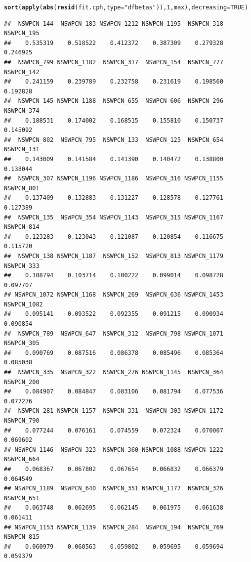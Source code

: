 \documentclass{article}\usepackage[]{graphicx}\usepackage[]{color}
\makeatletter
\newcommand{\hlnum}[1]{\textcolor[rgb]{0.686,0.059,0.569}{#1}}%
\newcommand{\hlstr}[1]{\textcolor[rgb]{0.192,0.494,0.8}{#1}}%
\newcommand{\hlstd}[1]{\textcolor[rgb]{0.345,0.345,0.345}{#1}}%
\newcommand{\hlkwc}[1]{\textcolor[rgb]{0.333,0.667,0.333}{#1}}%
\newcommand{\hlkwd}[1]{\textcolor[rgb]{0.737,0.353,0.396}{\textbf{#1}}}%
\newenvironment{kframe}{%
 \def\at@end@of@kframe{}%
 \ifinner\ifhmode%
  \def\at@end@of@kframe{\end{minipage}}%
  \begin{minipage}{\columnwidth}%
 \fi\fi%
 \def\FrameCommand##1{\hskip\@totalleftmargin \hskip-\fboxsep
 \colorbox{shadecolor}{##1}\hskip-\fboxsep
     \hskip-\linewidth \hskip-\@totalleftmargin \hskip\columnwidth}%
 \MakeFramed {\advance\hsize-\width
   \@totalleftmargin\z@ \linewidth\hsize
   \@setminipage}}%
 {\par\unskip\endMakeFramed%
 \at@end@of@kframe}
\newenvironment{knitrout}{}{} %
\makeatother
\begin{document}
\begin{knitrout}
{}


\begin{kframe}\begin{alltt}
\hlkwd{sort}\hlstd{(}\hlkwd{apply}\hlstd{(}\hlkwd{abs}\hlstd{(}\hlkwd{resid}\hlstd{(fit.cph,} \hlkwc{type} \hlstd{=} \hlstr{"dfbetas"}\hlstd{)),} \hlnum{1}\hlstd{, max),} \hlkwc{decreasing} \hlstd{=} \hlnum{TRUE}\hlstd{)}
\end{alltt}
\begin{verbatim}
##  NSWPCN_144  NSWPCN_183 NSWPCN_1212 NSWPCN_1195  NSWPCN_318  NSWPCN_195 
##    0.535319    0.518522    0.412372    0.387309    0.279328    0.246925 
##  NSWPCN_799 NSWPCN_1182  NSWPCN_317  NSWPCN_154  NSWPCN_777  NSWPCN_142 
##    0.241159    0.239789    0.232758    0.231619    0.198560    0.192828 
##  NSWPCN_145 NSWPCN_1188  NSWPCN_655  NSWPCN_606  NSWPCN_296  NSWPCN_374 
##    0.188531    0.174002    0.168515    0.155810    0.150737    0.145092 
##  NSWPCN_802  NSWPCN_795  NSWPCN_133  NSWPCN_125  NSWPCN_654  NSWPCN_131 
##    0.143009    0.141584    0.141390    0.140472    0.138800    0.138044 
##  NSWPCN_307 NSWPCN_1196 NSWPCN_1186  NSWPCN_316 NSWPCN_1155  NSWPCN_801 
##    0.137409    0.132883    0.131227    0.128578    0.127761    0.127389 
##  NSWPCN_135  NSWPCN_354 NSWPCN_1143  NSWPCN_315 NSWPCN_1167  NSWPCN_814 
##    0.123283    0.123043    0.121087    0.120854    0.116675    0.115720 
##  NSWPCN_138 NSWPCN_1187  NSWPCN_152  NSWPCN_813 NSWPCN_1179  NSWPCN_333 
##    0.108794    0.103714    0.100222    0.099014    0.098728    0.097707 
## NSWPCN_1072 NSWPCN_1168  NSWPCN_269  NSWPCN_636 NSWPCN_1453 NSWPCN_1082 
##    0.095141    0.093522    0.092355    0.091215    0.090934    0.090854 
##  NSWPCN_789  NSWPCN_647  NSWPCN_312  NSWPCN_798 NSWPCN_1071  NSWPCN_305 
##    0.090769    0.087516    0.086378    0.085496    0.085364    0.085038 
##  NSWPCN_335  NSWPCN_322  NSWPCN_276 NSWPCN_1145  NSWPCN_364  NSWPCN_200 
##    0.084907    0.084847    0.083106    0.081794    0.077536    0.077276 
##  NSWPCN_281 NSWPCN_1157  NSWPCN_331  NSWPCN_303 NSWPCN_1172  NSWPCN_790 
##    0.077244    0.076161    0.074559    0.072324    0.070007    0.069602 
## NSWPCN_1146  NSWPCN_323  NSWPCN_360 NSWPCN_1088 NSWPCN_1222  NSWPCN_664 
##    0.068367    0.067802    0.067654    0.066832    0.066379    0.064549 
## NSWPCN_1189  NSWPCN_640  NSWPCN_351 NSWPCN_1177  NSWPCN_326  NSWPCN_651 
##    0.063748    0.062695    0.062145    0.061975    0.061638    0.061411 
## NSWPCN_1153 NSWPCN_1139  NSWPCN_284  NSWPCN_194  NSWPCN_769  NSWPCN_815 
##    0.060979    0.060563    0.059802    0.059695    0.059694    0.059379 

\end{verbatim}
\end{kframe}
\end{knitrout}
\end{document}
